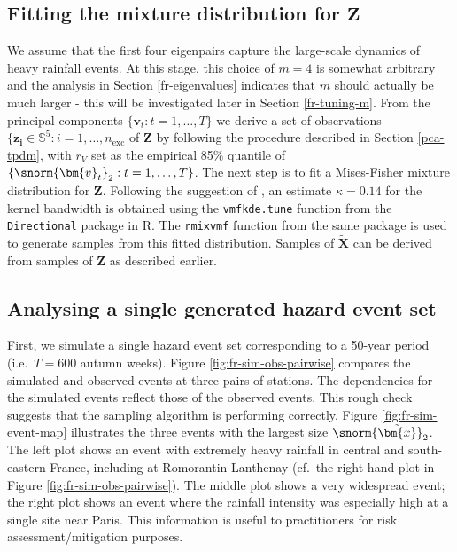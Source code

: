 \documentclass[en-GB, a4paper, nobind]{templates/bathreport}
\begin{document}
\hypertarget{fitting-the-mixture-distribution-for-bmz}{%
\subsection{\texorpdfstring{Fitting the mixture distribution for \(\bm{Z}\)}{Fitting the mixture distribution for \textbackslash bm\{Z\}}}\label{fitting-the-mixture-distribution-for-bmz}}

We assume that the first four eigenpairs capture the large-scale dynamics of heavy rainfall events. At this stage, this choice of \(m=4\) is somewhat arbitrary and the analysis in Section \ref{fr-eigenvalues} indicates that \(m\) should actually be much larger - this will be investigated later in Section \ref{fr-tuning-m}. From the principal components \(\{\bm{v}_t:t=1,\ldots,T\}\) we derive a set of observations \(\{\bm{z_i}\in\mathbb{S}^{5}:i=1,\ldots,n_{\text{exc}}\) of \(\bm{Z}\) by following the procedure described in Section \ref{pca-tpdm}, with \(r_V\) set as the empirical 85\% quantile of \(\{\snorm{\bm{v}_t}_2:t=1,\ldots,T\}\). The next step is to fit a Mises-Fisher mixture distribution for \(\bm{Z}\). Following the suggestion of \textcite{rohrbeckSimulatingFloodEvent2021}, an estimate \(\hat{\kappa}=0.14\) for the kernel bandwidth is obtained using the \texttt{vmfkde.tune} function from the \texttt{Directional} package in \textsf{R}. The \texttt{rmixvmf} function from the same package is used to generate samples from this fitted distribution. Samples of \(\tilde{\bm{X}}\) can be derived from samples of \(\bm{Z}\) as described earlier.

\hypertarget{analysing-a-single-generated-hazard-event-set}{%
\subsection{Analysing a single generated hazard event set}\label{analysing-a-single-generated-hazard-event-set}}

First, we simulate a single hazard event set corresponding to a 50-year period (i.e.~\(T=600\) autumn weeks). Figure \ref{fig:fr-sim-obs-pairwise} compares the simulated and observed events at three pairs of stations. The dependencies for the simulated events reflect those of the observed events. This rough check suggests that the sampling algorithm is performing correctly. Figure \ref{fig:fr-sim-event-map} illustrates the three events with the largest size \(\snorm{\tilde{\bm{x}}}_2\). The left plot shows an event with extremely heavy rainfall in central and south-eastern France, including at Romorantin-Lanthenay (cf.~the right-hand plot in Figure \ref{fig:fr-sim-obs-pairwise}). The middle plot shows a very widespread event; the right plot shows an event where the rainfall intensity was especially high at a single site near Paris. This information is useful to practitioners for risk assessment/mitigation purposes.
\end{document}

